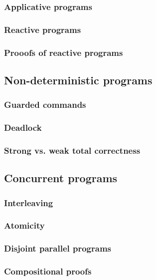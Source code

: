\documentclass[12pt, a4paper]{book}
\begin{document}
  \subsubsection{Applicative programs}
  \label{subs:Applicative programs}
  \subsubsection{Reactive programs}
  \label{subs:Reactive programs}
  \subsubsection{Prooofs of reactive programs}
  \label{subs:Prooofs of reactive programs}
  \subsection{Non-deterministic programs}
  \label{sub:Non-deterministic programs}
  \subsubsection{Guarded commands}
  \label{subs:Guarded commands}
  \subsubsection{Deadlock}
  \label{subs:Deadlock}
  \subsubsection{Strong vs. weak total correctness}
  \label{subs:Strong vs. weak total correctness}
  \subsection{Concurrent programs}
  \label{sub:Concurrent programs}
  \subsubsection{Interleaving}
  \label{subs:Interleaving}
  \subsubsection{Atomicity}
  \label{subs:Atomicity}
  \subsubsection{Disjoint parallel programs}
  \label{subs:Disjoint parallel programs}
  \subsubsection{Compositional proofs}
  \label{subs:Compositional proofs}
\end{document}
